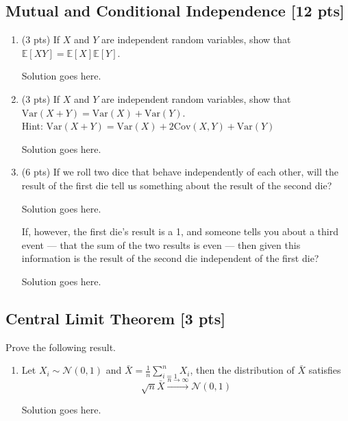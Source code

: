 \documentclass[a4paper]{article}
\theoremstyle{definition}
\newcommand{\Var}{\mathrm{Var}}
\newcommand{\Cov}{\mathrm{Cov}}
\newenvironment{soln}{
	\leavevmode\color{blue}\ignorespaces
}{}
\begin{document}
	\subsection{Mutual and Conditional Independence [12 pts]}
	\begin{enumerate}
		\item (3 pts) If $X$ and $Y$ are independent random variables, show that
		$\mathbb{E}[XY] = \mathbb{E}[X]\mathbb{E}[Y]$.
		
		\begin{soln}  Solution goes here. \end{soln}
		
		\item (3 pts) If $X$ and $Y$ are independent random variables, show that
		$\Var(X+Y) = \Var(X) + \Var(Y)$. \\
		Hint: $\Var(X+Y) = \Var(X) + 2\Cov(X, Y) + \Var(Y)$
		
		\begin{soln}  Solution goes here. \end{soln}
		
		\item (6 pts) If we roll two dice that behave independently of each
		other, will the result of the first die tell us something about the
		result of the second die? 
		
		\begin{soln}  Solution goes here. \end{soln}
		
		If, however, the first die's result is a 1,
		and someone tells you about a third event --- that the sum of the two
		results is even --- then given this information is the result of the second die
		independent of the first die? 
		
		\begin{soln}  Solution goes here. \end{soln}
	\end{enumerate}
	
	\subsection{Central Limit Theorem [3 pts]}
	Prove the following result.
	\begin{enumerate}
		\item Let $X_i\sim\mathcal{N}(0, 1)$ and $\bar{X} = \frac{1}{n}\sum_{i=1}^n X_i$, then the distribution of $\bar{X}$ satisfies 
		$$\sqrt{n}\bar{X}\overset{n\rightarrow\infty}{\longrightarrow}\mathcal{N}(0, 1)$$
		
		\begin{soln}  Solution goes here. \end{soln}
		
	\end{enumerate}
	
\end{document}
